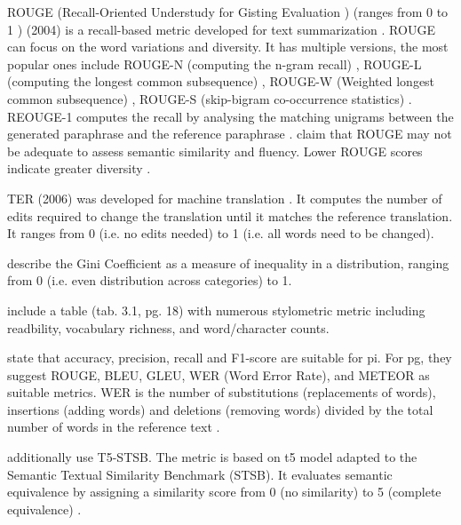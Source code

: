 ROUGE (Recall-Oriented Understudy for Gisting Evaluation \cite{palivela_optimization_2021}) (ranges from 0 to 1 \cite{kurt_pehlivanoglu_comparative_2024}) (2004) 
is a recall-based metric developed for text summarization \cite{zhou_paraphrase_2021,palivela_optimization_2021,kurt_pehlivanoglu_comparative_2024}.
ROUGE can focus on the word variations and diversity.
It has multiple versions, the most popular ones include 
ROUGE-N (computing the n-gram recall) \cite{zhou_paraphrase_2021,palivela_optimization_2021,kurt_pehlivanoglu_comparative_2024}, 
ROUGE-L (computing the longest common subsequence) \cite{zhou_paraphrase_2021,palivela_optimization_2021,kurt_pehlivanoglu_comparative_2024}, 
ROUGE-W (Weighted longest common subsequence) \cite{palivela_optimization_2021}, 
ROUGE-S (skip-bigram co-occurrence statistics) \cite{palivela_optimization_2021}.
REOUGE-1 computes the recall by analysing the matching unigrams between the generated paraphrase and the reference paraphrase \cite{palivela_optimization_2021,kurt_pehlivanoglu_comparative_2024}.
\citet{kurt_pehlivanoglu_comparative_2024} claim that ROUGE may not be adequate to assess semantic similarity and fluency.
Lower ROUGE scores indicate greater diversity \cite{kurt_pehlivanoglu_comparative_2024}.

TER (2006) was developed for machine translation \cite{zhou_paraphrase_2021}.
It computes the number of edits required to change the translation until it matches the reference translation.
It ranges from 0 (i.e. no edits needed) to 1 (i.e. all words need to be changed).

\citet{fu_learning_2024} describe the Gini Coefficient as a measure of inequality in a distribution, ranging from 0 (i.e. even distribution across categories) to 1.

\citet{master_thesis_paraphrasing_2024} include a table (tab. 3.1, pg. 18) with numerous stylometric metric including readbility, vocabulary richness, and word/character counts.

\citet{palivela_optimization_2021} state that accuracy, precision, recall and F1-score are suitable for \ac{pi}.
For \ac{pg}, they suggest ROUGE, BLEU, GLEU, WER (Word Error Rate), and METEOR as suitable metrics.
WER is the number of substitutions (replacements of words), insertions (adding words) and deletions (removing words) 
divided by the total number of words in the reference text \cite{palivela_optimization_2021}.

\citet{kurt_pehlivanoglu_comparative_2024} additionally use T5-STSB.
The metric is based on \ac{t5} model adapted to the Semantic Textual Similarity Benchmark (STSB).
It evaluates semantic equivalence by assigning a similarity score from 0 (no similarity) to 5 (complete equivalence) \cite{kurt_pehlivanoglu_comparative_2024}.

